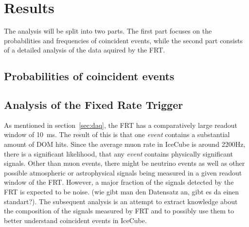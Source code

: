 \chapter{Results}

The analysis will be split into two parts. The first part focuses on the probabilities and frequencies of coincident events, while the second part 
consists of a detailed analysis of the data aquired by the FRT. 

\section{Probabilities of coincident events}\label{sec:muon_coincidence}

\section{Analysis of the Fixed Rate Trigger}

As mentioned in section~\ref{sec:daq}, the FRT has a comparatively large readout window of \SI{10}{ms}. The result of this is that one \textit{event} contains 
a substantial amount of DOM hits. Since the average muon rate in IceCube is around \num{2200}\unit{Hz}, there is a significant likelihood, that any \textit{event}
contains physically significant signals. Other than muon events, there might be neutrino events as well as other possible atmospheric or astrophysical signals 
being measured in a given readout window of the FRT. However, a major fraction of the signals detected by the FRT is expected to be noise. 
(wie gibt man den Datensatz an, gibt es da einen standart?). The subsequent analysis is an attempt to extract knowledge about the composition of the signals 
measured by FRT and to possibly use them to better understand coincident events in IceCube.\\

